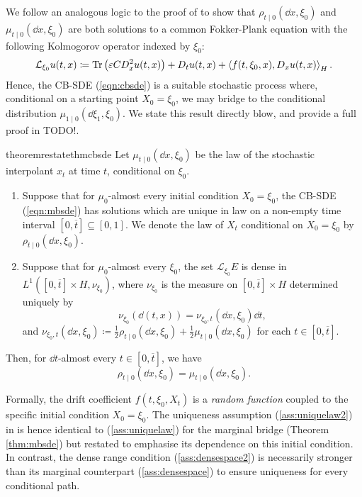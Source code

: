 We follow an analogous logic to the proof of  to show that \(\rho_{t \mid 0}(\dd{x}, \xi_{0})\) and \(\mu_{t \mid 0}(\dd{x}, \xi_{0})\) are both solutions to a common Fokker-Plank equation with the following Kolmogorov operator indexed by \(\xi_{0}\):
\[
  \mathcal{L}_{\xi_{0}} u(t, x) \coloneqq \operatorname{Tr}\qty(\varepsilon C D^{2}_{x} u(t, x)) + D_{t}u(t, x) + \ev{f(t, \xi_{0}, x), D_{x} u(t, x)}_{H}.
\] Hence, the CB-SDE (\ref{eqn:cbsde}) is a suitable stochastic process where, conditional on a starting point \(X_{0} = \xi_{0}\), we may bridge to the conditional distribution \(\mu_{1 \mid 0}(\dd{\xi_{1}}, \xi_{0})\). We state this result directly blow, and provide a full proof in  TODO!.
\begin{theorembox}
  \begin{restatable}{theorem}{restatethmcbsde}\label{thm:cbsde}
    Let \(\mu_{t\mid 0}(\dd{x}, \xi_{0})\) be the law of the stochastic interpolant \(x_{t}\) at time \(t\), conditional on \(\xi_{0}\).
    \begin{enumerate}
      \item \label{ass:uniquelaw2} Suppose that for \(\mu_{0}\)-almost every initial condition \(X_{0} = \xi_{0}\), the CB-SDE (\ref{eqn:mbsde}) has solutions which are unique in law on a non-empty time interval \([0, \overline{t}] \subseteq [0, 1]\). We denote the law of \(X_{t}\) conditional on \(X_{0} = \xi_{0}\) by \(\rho_{t \mid 0}(\dd{x}, \xi_{0})\).
      \item \label{ass:densespace2} Suppose that for \(\mu_{0}\)-almost every \(\xi_{0}\), the set \(\mathcal{L}_{\xi_{0}}E\) is dense in \(L^{1}([0, \overline{t} ]\times H, \nu_{\xi_{0}})\), where \(\nu_{\xi_{0}}\) is the measure on \([0, \overline{t}] \times H\) determined uniquely by
        \[
          \nu_{\xi_{0}}(\dd{(t, x)}) = \nu_{\xi_{0}, t}(\dd{x}, \xi_{0}) \dd{t},
        \]
        and \(\nu_{\xi_{0}, t}(\dd{x}, \xi_{0}) \coloneqq \frac{1}{2} \rho_{t \mid 0}(\dd{x}, \xi_{0}) + \frac{1}{2} \mu_{t\mid 0}(\dd{x}, \xi_{0})\) for each \(t \in [0, \overline{t}]\).

    \end{enumerate}

    Then, for \(\dd{t}\)-almost every \(t \in [0, \overline{t}]\), we have
    \[
      \rho_{t \mid 0}(\dd{x}, \xi_{0}) = \mu_{t \mid 0}(\dd{x}, \xi_{0}).
    \]
  \end{restatable}
\end{theorembox}

Formally, the drift coefficient \(f(t, \xi_{0}, X_{t})\) is a \textit{random function} coupled to the specific initial condition \(X_{0} = \xi_{0}\). The uniqueness assumption (\ref{ass:uniquelaw2}) in  is hence identical to (\ref{ass:uniquelaw}) for the marginal bridge (Theorem \ref{thm:mbsde}) but restated to emphasise its dependence on this initial condition. In contrast, the dense range condition (\ref{ass:densespace2}) is necessarily stronger than its marginal counterpart (\ref{ass:densespace}) to ensure uniqueness for every conditional path.

